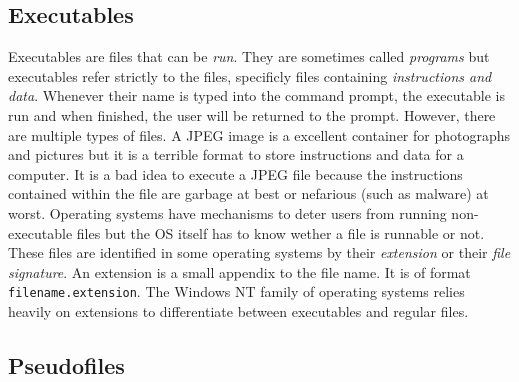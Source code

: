 \subsection{Executables}

Executables are files that can be \textit{run}. They are sometimes called \textit{programs} but executables refer
strictly to the files, specificly files containing \textit{instructions and data}. Whenever their name is
typed into the command prompt, the executable is run and when finished, the user will be returned to
the prompt. However, there are multiple types of files. A JPEG image is a excellent container for
photographs and pictures but it is a terrible format to store instructions and data for a computer.
It is a bad idea to execute a JPEG file because the instructions contained within the file are garbage
at best or nefarious (such as malware) at worst. Operating systems have mechanisms to deter users from
running non-executable files but the OS itself has to know wether a file is runnable or not. These files
are identified in some operating systems by their \textit{extension} or their \textit{file signature}. An extension is
a small appendix to the file name. It is of format \texttt{filename.extension}. The Windows NT family of operating
systems relies heavily on extensions to differentiate between executables and regular files. 

\subsection{Pseudofiles}

